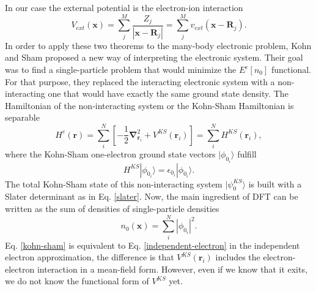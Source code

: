In our case the external potential is the electron-ion interaction
\begin{equation}
 V_{ext}(\mathbf{x})=\sum_{j}^{M}\frac{Z_{j}}{|\mathbf{x}-\mathbf{R}_{j}|}=\sum_{j}^{M}v_{ext}(\mathbf{x}-\mathbf{R}_{j}).
\end{equation}
In order to apply these two theorems to the many-body electronic problem, Kohn and Sham proposed a new way of interpreting the electronic system. Their goal was to find a single-particle problem that would minimize 
the $E^{e}[n_{0}]$ functional. For that purpose, they replaced the interacting electronic system with a non-interacting one that would have exactly the same ground state density. The Hamiltonian of the non-interacting 
system or the Kohn-Sham Hamiltonian is separable
\begin{equation}
 H^{e}(\mathbf{r})=\sum_{i}^{N}\left[-\frac{1}{2}\boldsymbol{\nabla}_{\mathbf{r}_{i}}^{2}+V^{KS}(\mathbf{r}_{i})\right]=\sum_{i}^{N}H^{KS}(\mathbf{r}_{i}),
\end{equation}
where the Kohn-Sham one-electron ground state vectors $|\phi_{0_{i}}\rangle$ fulfill
\begin{equation}
\label{kohn-sham}
 H^{KS}|\phi_{0_{i}}\rangle=\epsilon_{0_{i}}|\phi_{0_{i}}\rangle.
\end{equation}
The total Kohn-Sham state of this non-interacting system $|\psi_{0}^{KS}\rangle$ is built with a Slater determinant as in Eq. \ref{slater}. Now, the main ingredient of DFT can be written as the sum of densities of 
single-particle densities
\begin{equation}
\label{electronic-density}
 n_{0}(\mathbf{x})=\sum_{i}^{N}|\phi_{0_{i}}|^{2}.
\end{equation}
Eq. \ref{kohn-sham} is equivalent to Eq. \ref{independent-electron} in the independent electron approximation, the difference is that $V^{KS}(\mathbf{r}_{i})$ includes the electron-electron interaction in a mean-field 
form. However, even if we know that it exits, we do not know the functional form of $V^{KS}$ yet. \\


